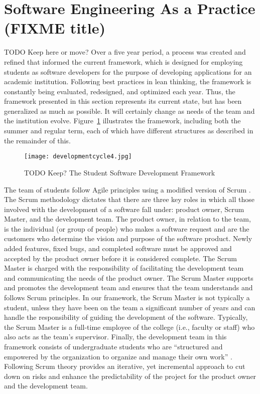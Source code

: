 \section{Software Engineering As a Practice (FIXME title)}
TODO Keep here or move?  Over a five year period, a process was created and refined that informed the current framework, which is designed for employing students as software developers for the purpose of developing applications for an academic institution. Following best practices in lean thinking, the framework is constantly being evaluated, redesigned, and optimized each year. Thus, the framework presented in this section represents its current state, but has been generalized as much as possible. It will certainly change as needs of the team and the institution evolve. Figure~\ref{fig:framework} illustrates the framework, including both the summer and regular term, each of which have different structures as described in the remainder of this.

\begin{figure}[htbp]
 \centering
 \texttt{[image: developmentcycle4.jpg]}
 \caption{TODO Keep? The Student Software Development Framework}
 \label{fig:framework}
\end{figure}


The team of students follow Agile principles \cite{agilemanifesto} using a modified version of Scrum \cite{thescrumguide}. The Scrum methodology dictates that there are three key roles in which all those involved with the development of a software fall under: product owner, Scrum Master, and the development team. The product owner, in relation to the team, is the individual (or group of people) who makes a software request and are the customers who determine the vision and purpose of the software product. Newly added features, fixed bugs, and completed software must be approved and accepted by the product owner before it is considered complete. The Scrum Master is charged with the responsibility of facilitating the development team and communicating the needs of the product owner. The Scrum Master supports and promotes the development team and ensures that the team understands and follows Scrum principles. In our framework, the Scrum Master is not typically a student, unless they have been on the team a significant number of years and can handle the responsibility of guiding the development of the software. Typically, the Scrum Master is a full-time employee of the college (i.e., faculty or staff) who also acts as the team's supervisor. Finally, the development team in this framework consists of undergraduate students who are ``structured and empowered by the organization to organize and manage their own work'' \cite{thescrumguide}. Following Scrum theory provides an iterative, yet incremental approach to cut down on risks and enhance the predictability of the project for the product owner and the development team.

